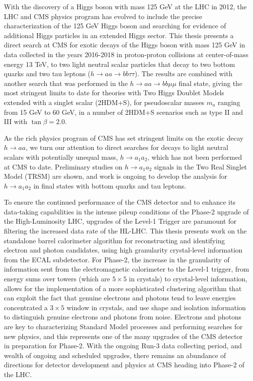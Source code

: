 With the discovery of a Higgs boson with mass 125 GeV at the LHC in 2012, the LHC and CMS physics program has evolved to include the precise characterization of the 125 GeV Higgs boson and searching for evidence of additional Higgs particles in an extended Higgs sector. This thesis presents a direct search at CMS for exotic decays of the Higgs boson with mass 125 GeV in data collected in the years 2016-2018 in proton-proton collisions at center-of-mass energy 13 TeV, to two light neutral scalar particles that decay to two bottom quarks and two tau leptons ($h \rightarrow aa \rightarrow bb\tau\tau$). The results are combined with another search that was performed in the $h \rightarrow aa \rightarrow bb\mu\mu$ final state, giving the most stringent limits to date for theories with Two Higgs Doublet Models extended with a singlet scalar (2HDM+S), for pseudoscalar masses $m_a$ ranging from 15 GeV to 60 GeV, in a number of 2HDM+S scenarios such as type II and III with $\tan\beta = 2.0$.

As the rich physics program of CMS has set stringent limits on the exotic decay $h \rightarrow aa$, we turn our attention to direct searches for decays to light neutral scalars with potentially unequal mass, $h \rightarrow a_1 a_2$, which has not been performed at CMS to date. Preliminary studies on $h \rightarrow a_1 a_2$ signals in the Two Real Singlet Model (TRSM) are shown, and work is ongoing to develop the analysis for $h \rightarrow a_1 a_2$ in final states with bottom quarks and tau leptons.

To ensure the continued performance of the CMS detector and to enhance its data-taking capabilities in the intense pileup conditions of the Phase-2 upgrade of the High-Luminosity LHC, upgrades of the Level-1 Trigger are paramount for filtering the increased data rate of the HL-LHC. This thesis presents work on the standalone barrel calorimeter algorithm for reconstructing and identifying electron and photon candidates, using high granularity crystal-level information from the ECAL subdetector. For Phase-2, the increase in the granularity of information sent from the electromagnetic calorimeter to the Level-1 trigger, from energy sums over towers (which are $5\times 5$ in crystals) to crystal-level information, allows for the implementation of a more sophisticated clustering algorithm that can exploit the fact that genuine electrons and photons tend to leave energies concentrated a $3 \times 5$ window in crystals, and use shape and isolation information to distinguish genuine electrons and photons from noise. Electrons and photons are key to characterizing Standard Model processes and performing searches for new physics, and this represents one of the many upgrades of the CMS detector in preparation for Phase-2. With the ongoing Run-3 data collecting period, and wealth of ongoing and scheduled upgrades, there remains an abundance of directions for detector development and physics at CMS heading into Phase-2 of the LHC.